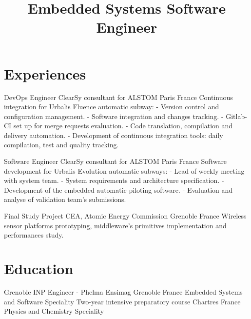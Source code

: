 \documentclass[10pt,a4paper]{moderncv}
\title{\large Embedded Systems Software Engineer}
\begin{document}
\maketitle

\section{Experiences}

  {DevOps Engineer}
	{ClearSy consultant for ALSTOM}
	{Paris}
	{France}
  {Continuous integration for Urbalis Fluence automatic subway:\newline{}
  - Version control and configuration management. \newline{}
  - Software integration and changes tracking. \newline{}
  - Gitlab-CI set up for merge requests evaluation.\newline{} 
  - Code translation, compilation and delivery automation.\newline{} 
  - Development of continuous integration tools: daily compilation, test and quality tracking.\newline{} }  
  
	{Software Engineer}
	{ClearSy consultant for ALSTOM}
	{Paris}
	{France}
  {Software development for Urbalis Evolution automatic subways:\newline{}
  - Lead of weekly meeting with system team.\newline{}
  - System requirements and architecture specification.\newline{}
  - Development of the embedded automatic piloting software.\newline{}
  - Evaluation and analyse of validation team's submissions.\newline{}}

	{Final Study Project}
	{CEA, Atomic Energy Commission}
	{Grenoble}
	{France}
  {Wireless sensor platforms prototyping, middleware's primitives implementation and performances study.\newline{}}

\section{Education}
	{Grenoble INP Engineer - Phelma Ensimag}
	{}
	{Grenoble}
	{France}
	{Embedded Systems and Software Speciality\newline{}}
	{Two-year intensive preparatory  course}
	{}
	{Chartres}
	{France}
	{Physics and Chemistry Speciality\newline{}}
\end{document}
